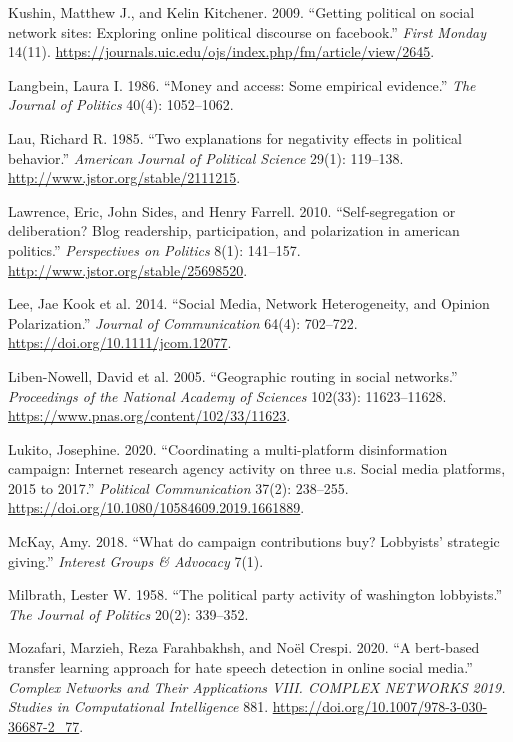 \documentclass[12pt,]{article}
\begin{document}
\leavevmode\hypertarget{ref-kushin2009}{}%
Kushin, Matthew J., and Kelin Kitchener. 2009. ``Getting political on
social network sites: Exploring online political discourse on
facebook.'' \emph{First Monday} 14(11).
\url{https://journals.uic.edu/ojs/index.php/fm/article/view/2645}.

\leavevmode\hypertarget{ref-langbein1986}{}%
Langbein, Laura I. 1986. ``Money and access: Some empirical evidence.''
\emph{The Journal of Politics} 40(4): 1052--1062.

\leavevmode\hypertarget{ref-lau1985}{}%
Lau, Richard R. 1985. ``Two explanations for negativity effects in
political behavior.'' \emph{American Journal of Political Science}
29(1): 119--138. \url{http://www.jstor.org/stable/2111215}.

\leavevmode\hypertarget{ref-lawrence2010}{}%
Lawrence, Eric, John Sides, and Henry Farrell. 2010. ``Self-segregation
or deliberation? Blog readership, participation, and polarization in
american politics.'' \emph{Perspectives on Politics} 8(1): 141--157.
\url{http://www.jstor.org/stable/25698520}.

\leavevmode\hypertarget{ref-lee2014}{}%
Lee, Jae Kook et al. 2014. ``Social Media, Network Heterogeneity, and
Opinion Polarization.'' \emph{Journal of Communication} 64(4): 702--722.
\url{https://doi.org/10.1111/jcom.12077}.

\leavevmode\hypertarget{ref-liben2005}{}%
Liben-Nowell, David et al. 2005. ``Geographic routing in social
networks.'' \emph{Proceedings of the National Academy of Sciences}
102(33): 11623--11628. \url{https://www.pnas.org/content/102/33/11623}.

\leavevmode\hypertarget{ref-lukito2020}{}%
Lukito, Josephine. 2020. ``Coordinating a multi-platform disinformation
campaign: Internet research agency activity on three u.s. Social media
platforms, 2015 to 2017.'' \emph{Political Communication} 37(2):
238--255. \url{https://doi.org/10.1080/10584609.2019.1661889}.

\leavevmode\hypertarget{ref-mckay2018}{}%
McKay, Amy. 2018. ``What do campaign contributions buy? Lobbyists'
strategic giving.'' \emph{Interest Groups \& Advocacy} 7(1).

\leavevmode\hypertarget{ref-milbrath1958}{}%
Milbrath, Lester W. 1958. ``The political party activity of washington
lobbyists.'' \emph{The Journal of Politics} 20(2): 339--352.

\leavevmode\hypertarget{ref-mozafari2020}{}%
Mozafari, Marzieh, Reza Farahbakhsh, and Noël Crespi. 2020. ``A
bert-based transfer learning approach for hate speech detection in
online social media.'' \emph{Complex Networks and Their Applications
VIII. COMPLEX NETWORKS 2019. Studies in Computational Intelligence} 881.
\url{https://doi.org/10.1007/978-3-030-36687-2_77}.
\end{document}
